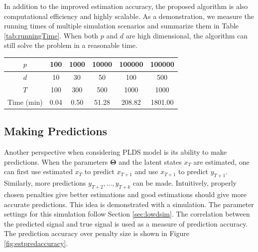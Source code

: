 \documentclass[fleqn]{article}
\let\oldref\ref
\renewcommand{\ref}[1]{(\oldref{#1})}
\begin{document}
In addition to the improved estimation accuracy, the proposed algorithm is also computational efficiency and highly scalable. As a demonstration, we measure the running times of multiple simulation scenarios and summarize them in Table \oldref{tab:runningTime}. When both $p$ and $d$ are high dimensional, the algorithm can still solve the problem in a reasonable time.
\begin{center}
\label{tab:runningTime}
\begin{tabular}{c|ccccc}
\hline\hline
$p$ & 100 & 1000 & 10000 & 100000 & 100000\\
\hline
$d$ & 10 & 30 & 50 & 100 & 500 \\
\hline
$T$ & 100 & 300 & 500 & 1000 & 1000 \\
\hline
Time (min)& 0.04 & 0.50  & 51.28 & 208.82 & 1801.00 \\
\hline\hline
\end{tabular}
\end{center}
\subsection{Making Predictions}
Another perspective when considering PLDS model is its ability to make predictions. When the parameters $\mathbf{\Theta}$ and the latent states $x_T$ are estimated, one can first use estimated $x_T$ to predict $x_{T+1}$ and use $x_{T+1}$ to predict $y_{T+1}$. Similarly, more predictions $y_{T+2},\ldots, y_{T+k}$ can be made. Intuitively, properly chosen penalties give better estimations and good estimations should give more accurate predictions. This idea is demonstrated with a simulation. The parameter settings for this simulation follow Section \oldref{sec:lowdsim}. The correlation between the predicted signal and true signal is used as a measure of prediction accuracy. The prediction accuracy over penalty size is shown in Figure \oldref{fig:estpredaccuracy}.


\end{document}
